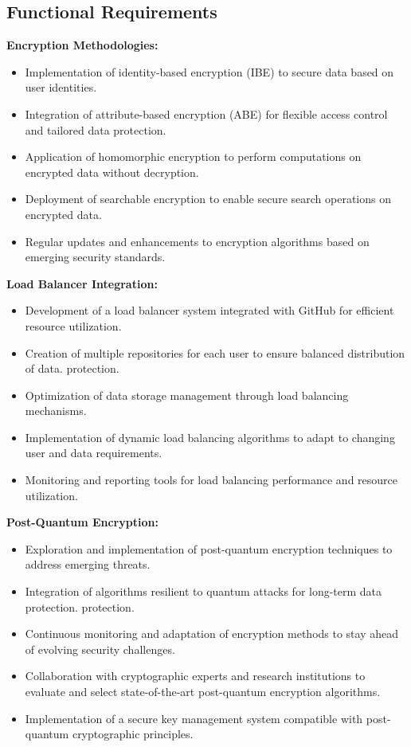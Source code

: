 \subsection{Functional Requirements}

\hspace{1.5em}\textbf{Encryption Methodologies:} 
\begin{itemize}
  \item Implementation of identity-based encryption (IBE) to secure data based on user identities. 
\item Integration of attribute-based encryption (ABE) for flexible access control and tailored data
protection. 
\item Application of homomorphic encryption to perform computations on encrypted data without
decryption. 
\item Deployment of searchable encryption to enable secure search operations on encrypted data. 
\item Regular updates and enhancements to encryption algorithms based on emerging security standards. 
\end{itemize}

\textbf{Load Balancer Integration:} 
\begin{itemize}
  \item Development of a load balancer system integrated with GitHub for efficient resource utilization. 
\item Creation of multiple repositories for each user to ensure balanced distribution of data. 
protection. 
\item Optimization of data storage management through load balancing mechanisms. 
\item Implementation of dynamic load balancing algorithms to adapt to changing user and data
requirements.  
\item Monitoring and reporting tools for load balancing performance and resource utilization. 
\end{itemize}

\textbf{Post-Quantum Encryption:}
\begin{itemize}
  \item Exploration and implementation of post-quantum encryption techniques to address emerging
threats. 
\item Integration of algorithms resilient to quantum attacks for long-term data protection.
protection. 
\item Continuous monitoring and adaptation of encryption methods to stay ahead of evolving security
challenges.  
\item Collaboration with cryptographic experts and research institutions to evaluate and select state-of-the-art post-quantum encryption algorithms.  
\item Implementation of a secure key management system compatible with post-quantum cryptographic
principles. 
\end{itemize}

